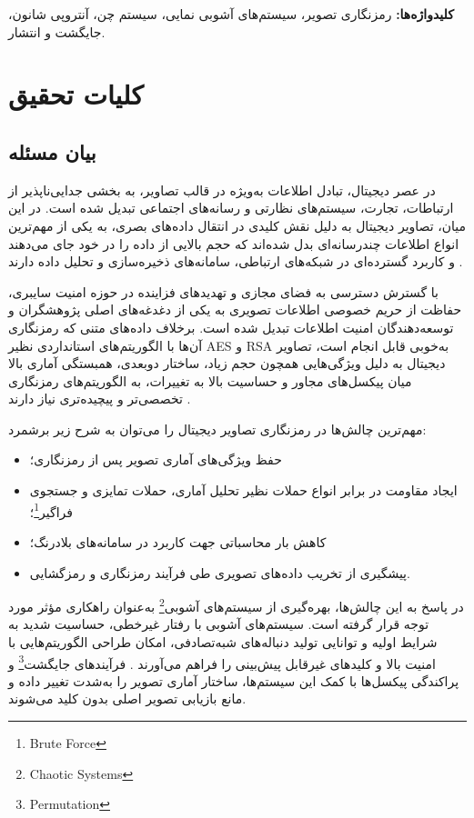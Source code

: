 \documentclass[a4paper,12pt]{report}
\renewcommand{\%}{\lr{\oldpercent}}
\providecommand{\lr}[1]{#1}
\providecommand{\LTRfootnote}[1]{\footnote{#1}}
\begin{document}
    \vspace{1cm}
    \textbf{کلیدواژه‌ها:} رمزنگاری تصویر، سیستم‌های آشوبی نمایی، سیستم چن، آنتروپی شانون، جایگشت و انتشار.
    \newpage



\chapter{کلیات تحقیق}

\section{بیان مسئله}
در عصر دیجیتال، تبادل اطلاعات به‌ویژه در قالب تصاویر، به بخشی جدایی‌ناپذیر از ارتباطات، تجارت، سیستم‌های نظارتی و رسانه‌های اجتماعی تبدیل شده است. در این میان، تصاویر دیجیتال به دلیل نقش کلیدی در انتقال داده‌های بصری، به یکی از مهم‌ترین انواع اطلاعات چندرسانه‌ای بدل شده‌اند که حجم بالایی از داده را در خود جای می‌دهند و کاربرد گسترده‌ای در شبکه‌های ارتباطی، سامانه‌های ذخیره‌سازی و تحلیل داده دارند \cite{ref1}.

با گسترش دسترسی به فضای مجازی و تهدیدهای فزاینده در حوزه امنیت سایبری، حفاظت از حریم خصوصی اطلاعات تصویری به یکی از دغدغه‌های اصلی پژوهشگران و توسعه‌دهندگان امنیت اطلاعات تبدیل شده است. برخلاف داده‌های متنی که رمزنگاری آن‌ها با الگوریتم‌های استانداردی نظیر \lr{AES} و \lr{RSA} به‌خوبی قابل انجام است، تصاویر دیجیتال به دلیل ویژگی‌هایی همچون حجم زیاد، ساختار دوبعدی، همبستگی آماری بالا میان پیکسل‌های مجاور و حساسیت بالا به تغییرات، به الگوریتم‌های رمزنگاری تخصصی‌تر و پیچیده‌تری نیاز دارند \cite{ref2, ref3}.

مهم‌ترین چالش‌ها در رمزنگاری تصاویر دیجیتال را می‌توان به شرح زیر برشمرد:
\begin{itemize}
    \item حفظ ویژگی‌های آماری تصویر پس از رمزنگاری؛
    \item ایجاد مقاومت در برابر انواع حملات نظیر تحلیل آماری، حملات تمایزی و جستجوی فراگیر\LTRfootnote{Brute Force}؛
    \item کاهش بار محاسباتی جهت کاربرد در سامانه‌های بلادرنگ؛
    \item پیشگیری از تخریب داده‌های تصویری طی فرآیند رمزنگاری و رمزگشایی.
\end{itemize}

در پاسخ به این چالش‌ها، بهره‌گیری از سیستم‌های آشوبی\LTRfootnote{Chaotic Systems} به‌عنوان راهکاری مؤثر مورد توجه قرار گرفته است. سیستم‌های آشوبی با رفتار غیرخطی، حساسیت شدید به شرایط اولیه و توانایی تولید دنباله‌های شبه‌تصادفی، امکان طراحی الگوریتم‌هایی با امنیت بالا و کلیدهای غیرقابل پیش‌بینی را فراهم می‌آورند \cite{ref4}. فرآیندهای جایگشت\LTRfootnote{Permutation} و پراکندگی پیکسل‌ها با کمک این سیستم‌ها، ساختار آماری تصویر را به‌شدت تغییر داده و مانع بازیابی تصویر اصلی بدون کلید می‌شوند.
\end{document}

